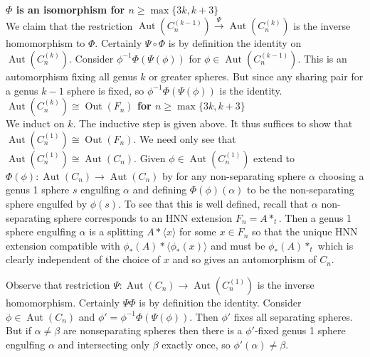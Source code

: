 \documentclass[12pt]{article}
\newcommand{\Aut}[1]{\ensuremath{ \aaut \left (#1 \right ) }}
\newcommand{\outn}{{\ensuremath{ \oout(F_n)}} }
\DeclareMathOperator{\oout}{Out}
\DeclareMathOperator{\aaut}{Aut}
\begin{document}
\noindent \textbf{$\Phi$ is an isomorphism for $n \geq \max\{3k ,k+3\}$}\\

We claim that the restriction $\Aut{C^{(k-1)}_n} \stackrel{\Psi}{\to} \Aut{C^{(k)}_n}$ is the inverse homomorphism to $\Phi$.
Certainly $\Psi \circ \Phi$ is by definition the identity on $\Aut{C^{(k)}_n}$.
Consider $\phi^{-1}\Phi(\Psi(\phi))$ for $\phi \in \Aut{C^{(k-1)}_n}$.
This is an automorphism fixing all genus $k$ or greater spheres. 
But since any sharing pair for a genus $k-1$ sphere is fixed, so $\phi^{-1}\Phi(\Psi(\phi))$ is the identity.\\


\noindent \textbf{ $\Aut{C^{(k)}_n} \cong \outn$ for $n \geq \max\{3k ,k+3\}$}\\

We induct on $k$.
The inductive step is given above.
It thus suffices to show that $\Aut{C^{(1)}_n} \cong \outn$. We need only see that $\Aut{C^{(1)}_n} \cong \Aut{C_n}$.
Given $ \phi \in \Aut{C^{(1)}_n}$ extend to $ \Phi(\phi): \Aut{C_n} \to \Aut{C_n}$
by for any non-separating sphere $\alpha$ choosing a genus 1 sphere $s$ engulfing $\alpha$ and defining $\Phi(\phi)(\alpha)$ to be the non-separating sphere engulfed by $\phi(s)$.
To see that this is well defined, recall that $\alpha$ non-separating sphere corresponds to an HNN extension $F_n=A\ast_t$. Then a genus 1 sphere engulfing $\alpha$ is a splitting $A \ast \langle x \rangle$ for some $x \in F_n$ so that the unique HNN extension compatible with $\phi_\ast(A) \ast \langle \phi_\ast(x) \rangle$ and must be $\phi_\ast(A) \ast_t$ which is clearly independent of the choice of $x$ and so gives an automorphism of $C_n$.



Observe that restriction 
$\Psi: \Aut{C_n} \to \Aut{C^{(1)}_n}$
is the inverse homomorphism.
Certainly $\Psi \Phi$ is by definition the identity.
Consider $\phi \in \Aut{C_n}$ and $\phi'=\phi^{-1} \Phi(\Psi(\phi))$.
Then $\phi'$ fixes all separating spheres.
But if $\alpha \neq \beta$ are nonseparating spheres then there is a $\phi'$-fixed genus 1 sphere engulfing $\alpha$ and intersecting only $\beta$ exactly once, so $\phi'(\alpha) \neq \beta$.
\end{document}
